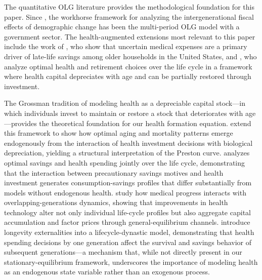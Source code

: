 \documentclass[12pt,a4paper]{article}
\begin{document}
The quantitative OLG literature provides the methodological foundation for this paper. Since \citet{AuerbachKotlikoff1987}, the workhorse framework for analyzing the intergenerational fiscal effects of demographic change has been the multi-period OLG model with a government sector. The health-augmented extensions most relevant to this paper include the work of \citet{DeNardi2010}, who show that uncertain medical expenses are a primary driver of late-life savings among older households in the United States, and \citet{KuhnFeichtinger2015}, who analyze optimal health and retirement choices over the life cycle in a framework where health capital depreciates with age and can be partially restored through investment.

The Grossman tradition of modeling health as a depreciable capital stock---in which individuals invest to maintain or restore a stock that deteriorates with age---provides the theoretical foundation for our health formation equation. \citet{DalgaardStrulik2014} extend this framework to show how optimal aging and mortality patterns emerge endogenously from the interaction of health investment decisions with biological depreciation, yielding a structural interpretation of the Preston curve. \citet{Fioroni2010} analyzes optimal savings and health spending jointly over the life cycle, demonstrating that the interaction between precautionary savings motives and health investment generates consumption-savings profiles that differ substantially from models without endogenous health. \citet{FrankovicWrzaczek2020} study how medical progress interacts with overlapping-generations dynamics, showing that improvements in health technology alter not only individual life-cycle profiles but also aggregate capital accumulation and factor prices through general-equilibrium channels. \citet{YewZhang2018} introduce longevity externalities into a lifecycle-dynastic model, demonstrating that health spending decisions by one generation affect the survival and savings behavior of subsequent generations---a mechanism that, while not directly present in our stationary-equilibrium framework, underscores the importance of modeling health as an endogenous state variable rather than an exogenous process.
\end{document}
